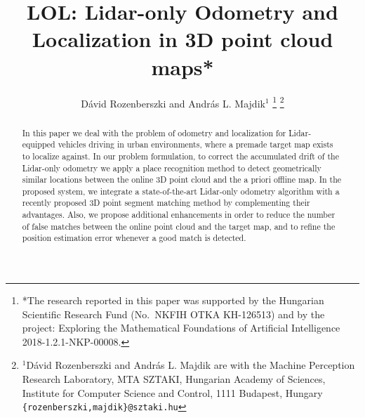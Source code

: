 \documentclass[letterpaper, 10 pt, conference]{ieeeconf}  %
\title{\LARGE \bf
LOL: Lidar-only Odometry and Localization in 3D point cloud maps*
}
\author{Dávid Rozenberszki and András L. Majdik$^{1}$%
\thanks{*The research reported in this paper was supported by the Hungarian Scientific Research Fund (No.\ NKFIH OTKA KH-126513) and by the project: Exploring the Mathematical Foundations of Artificial Intelligence 2018-1.2.1-NKP-00008.
}%
\thanks{$^{1}$Dávid Rozenberszki and András L. Majdik are with the Machine Perception Research Laboratory,
        MTA SZTAKI, Hungarian Academy of Sciences, Institute for Computer Science and Control, 1111 Budapest, Hungary
        {\tt\small \{rozenberszki,majdik\}@sztaki.hu}}%
}
\begin{document}
\maketitle
\thispagestyle{empty}
\pagestyle{empty}

\begin{abstract}
In this paper we deal with the problem of odometry and localization for Lidar-equipped vehicles driving in urban environments, where a premade target map exists to localize against.
In our problem formulation, to correct the accumulated drift of the Lidar-only odometry we apply a place recognition method to detect geometrically similar locations between the online 3D point cloud and the a priori offline map.
In the proposed system, we integrate a state-of-the-art Lidar-only odometry algorithm with a recently proposed 3D point segment matching method by complementing their advantages. 
Also, we propose additional enhancements in order to reduce the number of false matches between the online point cloud and the target map, and to refine the position estimation error whenever a good match is detected.

\end{abstract}
\end{document}
